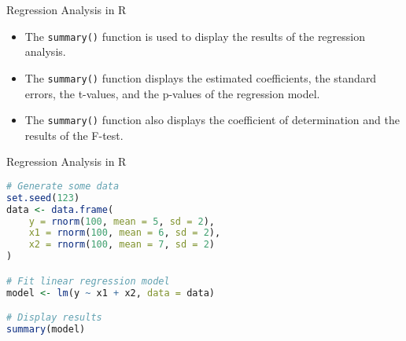 \documentclass[serif, 9pt, aspectratio=32]{beamer}
\begin{document}
\begin{frame}{Regression Analysis in R}
    \begin{itemize}
        \setlength{\itemsep}{2em}
        \item The \texttt{summary()} function is used to display the results of the regression analysis.
        \item The \texttt{summary()} function displays the estimated coefficients, the standard errors, the t-values, and the p-values of the regression model.
        \item The \texttt{summary()} function also displays the coefficient of determination and the results of the F-test.
    \end{itemize}
\end{frame}

\begin{frame}[fragile]{Regression Analysis in R}
    \begin{lstlisting}[language=R]
# Generate some data
set.seed(123)
data <- data.frame(
    y = rnorm(100, mean = 5, sd = 2),
    x1 = rnorm(100, mean = 6, sd = 2),
    x2 = rnorm(100, mean = 7, sd = 2)
)

# Fit linear regression model
model <- lm(y ~ x1 + x2, data = data)

# Display results
summary(model)
    \end{lstlisting}
\end{frame}
\end{document}
